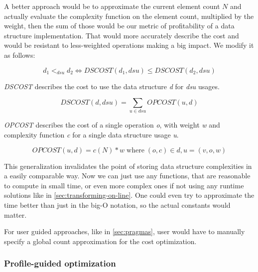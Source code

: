\documentclass[a4paper,11pt]{article}
\begin{document}
            A better approach would be to approximate the current element count $N$ and actually evaluate the complexity
            function on the element count, multiplied by the weight, then the sum of those would be our metric of
            profitability of a data structure implementation. That would more accurately describe the cost and would be
            resistant to less-weighted operations making a big impact. We modify it as follows:

            \begin{equation} \label{data-structure-order-weights}
                d_1 <_{dsu} d_2 \Leftrightarrow DSCOST(d_1, dsu) \leq DSCOST(d_2, dsu)
            \end{equation}

            \emph{DSCOST} describes the cost to use the data structure \emph{d} for \emph{dsu} usages.

            \begin{equation}
                DSCOST(d,dsu) = \sum_{u \in dsu} OPCOST(u,d)
            \end{equation}

            \emph{OPCOST} describes the cost of a single operation \emph{o}, with weight \emph{w} and 
            complexity function \emph{c} for a single data structure usage \emph{u}.

            \begin{equation}
                OPCOST(u,d) = c(N) * w \; \textrm{where} \; (o,c) \in d, u = (v, o, w)
            \end{equation}

            This generalization invalidates the point of storing data structure complexities in a easily comparable way.
            Now we can just use any functions, that are reasonable to compute in small time, or even more complex ones
            if not using any runtime solutions like in \autoref{sec:transforming-on-line}. One could even try to
            approximate the time better than just in the big-O notation, so the actual constants would matter.

            For user guided approaches, like in \autoref{sec:pragmas}, user would have to manually specify a global
            count approximation for the cost optimization.

		\subsubsection{Profile-guided optimization} \label{sec:pgo}
\end{document}
